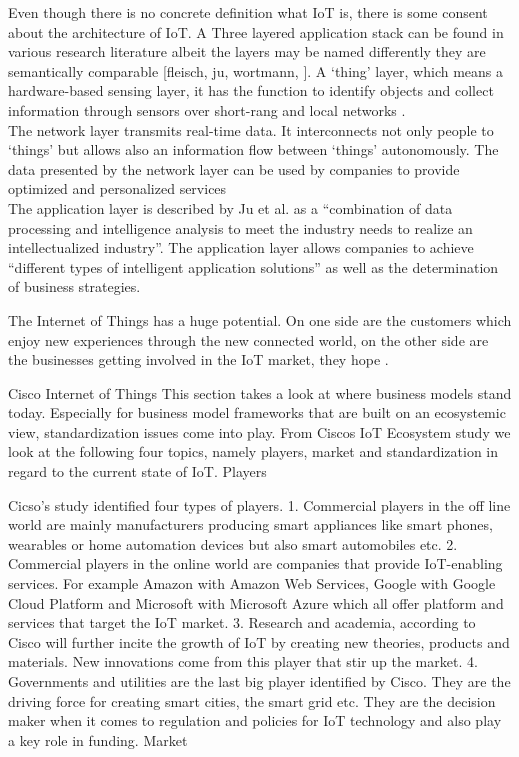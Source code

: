 Even though there is no concrete definition what IoT is, there is some consent about the architecture of IoT. A Three layered application stack can be found in various research literature albeit the layers may be named differently they are semantically comparable [fleisch, ju, wortmann, ]. A `thing' layer, which means a hardware-based sensing layer, it has the function to identify objects and collect information through sensors over short-rang and local networks \cite{ju}.\\
The network layer transmits real-time data. It interconnects not only people to `things' but allows also an information flow between `things' autonomously. The data presented by the network layer can be used by companies to provide optimized and personalized services \cite{ju}\\
The application layer is described by Ju et al. as a ``combination of data processing and intelligence analysis to meet the industry needs to realize an intellectualized industry''. The application layer allows companies to achieve ``different types of intelligent application solutions'' as well as the determination of business strategies\cite{ju}.

The Internet of Things has a huge potential. On one side are the customers which enjoy new experiences through the new connected world, on the other side are the businesses getting involved in the IoT market, they hope \cite{ju}.



Cisco Internet of Things
This section takes a look at where business models stand today. Especially for business model frameworks that are built on an ecosystemic view, standardization issues come into play. From Ciscos IoT Ecosystem study we look at the following four topics, namely players, market and standardization in regard to the current state of IoT.
Players

Cicso's study identified four types of players.
1. Commercial players in the off line world are mainly manufacturers producing smart appliances like smart phones, wearables or home automation devices but also smart automobiles etc.
2. Commercial players in the online world are companies that provide IoT-enabling services. For example Amazon with Amazon Web Services, Google with Google Cloud Platform and Microsoft with Microsoft Azure which all offer platform and services that target the IoT market.
3. Research and academia, according to Cisco will further incite the growth of IoT by creating new theories, products and materials. New innovations come from this player that stir up the market.
4. Governments and utilities are the last big player identified by Cisco. They are the driving force for creating smart cities, the smart grid etc. They are the decision maker when it comes to regulation and policies for IoT technology and also play a key role in funding.
Market

